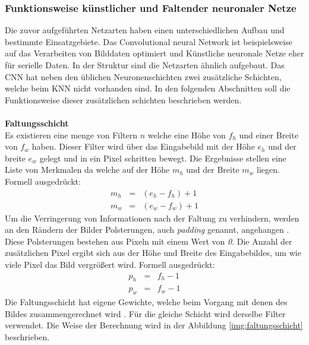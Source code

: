   \subsubsection{Funktionsweise künstlicher und Faltender neuronaler Netze}\label{s.funktwknnundcnn}
Die zuvor aufgeführten Netzarten haben einen unterschiedlichen Aufbau und bestimmte Einsatzgebiete. Das Convolutional neural Network ist beispielsweise auf das Verarbeiten von Bilddaten optimiert und Künstliche neuronale Netze eher für serielle Daten. In der Struktur sind die Netzarten ähnlich aufgebaut. Das CNN hat neben den üblichen Neuronenschichten zwei zusätzliche Schichten, welche beim KNN nicht vorhanden sind. In den folgenden Abschnitten soll die Funktionsweise dieser zusätzlichen schichten beschrieben werden.\\\\
\textbf{Faltungsschicht}\\
Es existieren eine menge von Filtern $n$ welche eine Höhe von $f_{h}$ und einer Breite von $f_{w}$ haben. Dieser Filter wird über das Eingabebild mit der Höhe $e_{h}$ und der breite $e_{w}$ gelegt und in ein Pixel schritten bewegt. Die Ergebnisse stellen eine Liste von Merkmalen da welche auf der Höhe $m_{h}$ und der Breite $m_{w}$ liegen. Formell ausgedrückt:
\begin{eqnarray} 
m_{h}&=&(e_{h} - f_{h})+1\\
m_{w}&=&(e_{w} - f_{w})+1
\end{eqnarray}
Um die Verringerung von Informationen nach der Faltung zu verhindern, werden an den Rändern der Bilder Polsterungen, auch \textit{padding} genannt, angehangen \cite[343]{goodfellow2016deep}. Diese Polsterungen bestehen aus Pixeln mit einem Wert von \textit{0}. Die Anzahl der zusätzlichen Pixel ergibt sich aus der Höhe und Breite des Eingabebildes, um wie viele Pixel das Bild vergrößert wird. Formell ausgedrückt:
\begin{eqnarray}
p_{h}&=&f_{h} - 1\\
p_{w}&=&f_{w} - 1
\end{eqnarray}
Die Faltungsschicht hat eigene Gewichte, welche beim Vorgang mit denen des Bildes zusammengerechnet wird \cite[331ff.]{goodfellow2016deep}. Für die gleiche Schicht wird derselbe Filter verwendet. Die Weise der Berechnung wird in der Abbildung \ref{img:faltungsschicht}  beschrieben.
